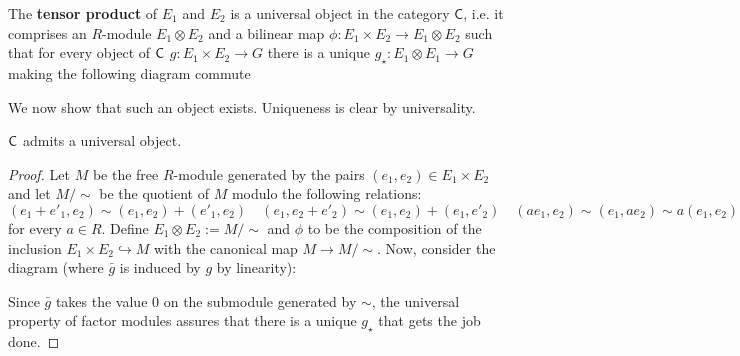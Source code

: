 \begin{center}
\end{center}

The \textbf{tensor product} of $E_1$ and $E_2$ is a universal object in the category $\textsf{C}$, i.e. it comprises an $R$-module $E_1 \otimes E_2$ and a bilinear map $\phi : E_1 \times E_2 \to E_1 \otimes E_2$ such that for every object of $\sf{C}$ $g:E_1 \times E_2 \to G$ there is a unique $g_{\star}: E_1 \otimes E_1 \to G$ making the following diagram commute 

\begin{center}
\end{center}

We now show that such an object exists. 
Uniqueness is clear by universality. 

\begin{thm}
$\sf{C}$ admits a universal object. 
\begin{proof}
Let $M$ be the free $R$-module generated by the pairs $(e_1, e_2) \in E_1 \times E_2$ and let $M/\sim$ be the quotient of $M$ modulo the following relations: 
$$(e_1 + e'_1, e_2) \sim (e_1, e_2) + (e'_1, e_2) \quad (e_1, e_2+ e'_2) \sim (e_1, e_2) + (e_1, e'_2) \quad (ae_1, e_2) \sim (e_1, ae_2) \sim a(e_1, e_2)$$ 
for every $a \in R$. 
Define $E_1 \otimes E_2 :=M/\sim$ and $\phi$ to be the composition of the inclusion $E_1 \times E_2 \hookrightarrow M$ with the canonical map $M \to M/\sim$. 
Now, consider the diagram (where $\bar{g}$ is induced by $g$ by linearity):
\begin{center}
\end{center}
Since $\bar{g}$ takes the value $0$ on the submodule generated by $\sim$, the universal property of factor modules assures that there is a unique $g_{\star}$ that gets the job done. 
\end{proof}
\end{thm} 

